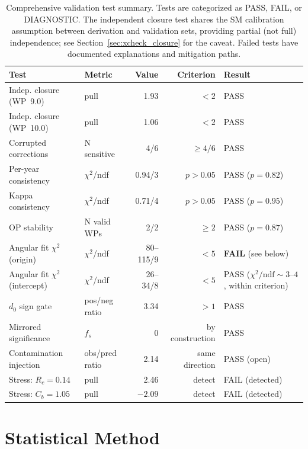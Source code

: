 \documentclass[11pt,a4paper]{article}
\begin{document}
\begin{table}[htbp]
\centering
\caption{Comprehensive validation test summary. Tests are categorized as PASS, FAIL,
or DIAGNOSTIC. The independent closure test shares the SM calibration assumption
between derivation and validation sets, providing partial (not full) independence;
see Section~\ref{sec:xcheck_closure} for the caveat.
Failed tests have documented explanations and mitigation paths.}
\label{tab:validation_summary}
\small
\begin{tabular}{llrrl}
\toprule
Test & Metric & Value & Criterion & Result \\
\midrule
Indep. closure (WP~9.0) & pull & 1.93 & $< 2$ & PASS \\
Indep. closure (WP~10.0) & pull & 1.06 & $< 2$ & PASS \\
Corrupted corrections & N sensitive & 4/6 & $\geq 4/6$ & PASS \\
Per-year consistency & $\chi^2$/ndf & 0.94/3 & $p > 0.05$ & PASS ($p = 0.82$) \\
Kappa consistency & $\chi^2$/ndf & 0.71/4 & $p > 0.05$ & PASS ($p = 0.95$) \\
OP stability & N valid WPs & 2/2 & $\geq 2$ & PASS ($p = 0.87$) \\
Angular fit $\chi^2$ (origin) & $\chi^2$/ndf & 80--115/9 & $< 5$ & \textbf{FAIL} (see below) \\
Angular fit $\chi^2$ (intercept) & $\chi^2$/ndf & 26--34/8 & $< 5$ & PASS ($\chi^2/\mathrm{ndf} \sim 3$--$4$, within criterion) \\
$d_0$ sign gate & pos/neg ratio & 3.34 & $> 1$ & PASS \\
Mirrored significance & $f_s$ & 0 & by construction & PASS \\
Contamination injection & obs/pred ratio & 2.14 & same direction & PASS (open) \\
Stress: $R_c = 0.14$ & pull & 2.46 & detect & FAIL (detected) \\
Stress: $C_b = 1.05$ & pull & $-2.09$ & detect & FAIL (detected) \\
\bottomrule
\end{tabular}
\end{table}

\FloatBarrier
{}
\section{Statistical Method}
\label{sec:statmethod}
\end{document}
